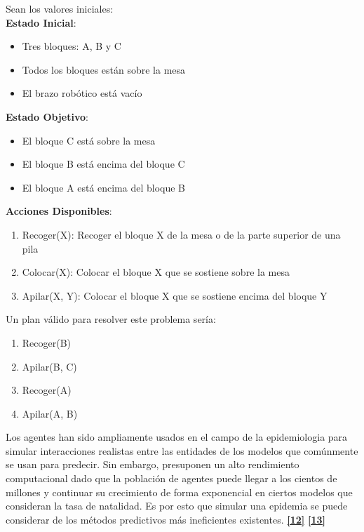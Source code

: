 \documentclass{article}
\begin{document}
        Sean los valores iniciales: \\

        \textbf{ Estado Inicial}:
        \begin{itemize}
        \item  Tres bloques: A, B y C
        \item  Todos los bloques están sobre la mesa
        \item  El brazo robótico está vacío \\
        \end{itemize}
        
        \textbf{ Estado Objetivo}: 
        \begin{itemize}
        \item  El bloque C está sobre la mesa 
        \item  El bloque B está encima del bloque C 
        \item  El bloque A está encima del bloque B \\
            
        \end{itemize}
        
        \textbf{Acciones Disponibles}:
        \begin{enumerate}
        
        \item  Recoger(X): Recoger el bloque X de la mesa o de la parte superior de una pila
        \item  Colocar(X): Colocar el bloque X que se sostiene sobre la mesa
        \item  Apilar(X, Y): Colocar el bloque X que se sostiene encima del bloque Y \\
        
        \end{enumerate}
        
        Un plan válido para resolver este problema sería:
        \begin{enumerate}
            
        \item  Recoger(B)
        \item  Apilar(B, C)
        \item  Recoger(A) 
        \item  Apilar(A, B)
        \end{enumerate}

    Los agentes han sido ampliamente usados en el campo de la epidemiologia para simular interacciones realistas entre las entidades de los modelos que comúnmente se usan para predecir. Sin embargo, presuponen un alto rendimiento computacional dado que la población de agentes puede llegar a los cientos de millones y continuar su crecimiento de forma exponencial en ciertos modelos que consideran la tasa de natalidad. Es por esto que simular una epidemia se puede considerar de los métodos predictivos más ineficientes existentes. \hyperref[sec:22]{\textbf{[12]}} \hyperref[sec:23]{\textbf{[13]}}
\end{document}
